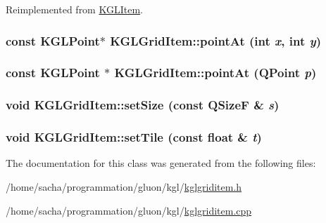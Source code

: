 Reimplemented from \hyperlink{class_k_g_l_item_2227b986b72366e149815a5fa5838d52}{KGLItem}.\hypertarget{class_k_g_l_grid_item_dcacb054e43744cdadf266eb544d827c}{
\subsubsection[{pointAt}]{\setlength{\rightskip}{0pt plus 5cm}const {\bf KGLPoint}$\ast$ KGLGridItem::pointAt (int {\em x}, \/  int {\em y})}}
\label{class_k_g_l_grid_item_dcacb054e43744cdadf266eb544d827c}


\hypertarget{class_k_g_l_grid_item_8141076182d7926b8a303639783286af}{
\subsubsection[{pointAt}]{\setlength{\rightskip}{0pt plus 5cm}const {\bf KGLPoint} $\ast$ KGLGridItem::pointAt (QPoint {\em p})}}
\label{class_k_g_l_grid_item_8141076182d7926b8a303639783286af}


\hypertarget{class_k_g_l_grid_item_5f2a3cccf7cf2ad90bf40e822907c660}{
\subsubsection[{setSize}]{\setlength{\rightskip}{0pt plus 5cm}void KGLGridItem::setSize (const QSizeF \& {\em s})}}
\label{class_k_g_l_grid_item_5f2a3cccf7cf2ad90bf40e822907c660}


\hypertarget{class_k_g_l_grid_item_7ca4ae016b8d4af31cddeea0654584df}{
\subsubsection[{setTile}]{\setlength{\rightskip}{0pt plus 5cm}void KGLGridItem::setTile (const float \& {\em t})}}
\label{class_k_g_l_grid_item_7ca4ae016b8d4af31cddeea0654584df}




The documentation for this class was generated from the following files:\begin{CompactItemize}
\item 
/home/sacha/programmation/gluon/kgl/\hyperlink{kglgriditem_8h}{kglgriditem.h}\item 
/home/sacha/programmation/gluon/kgl/\hyperlink{kglgriditem_8cpp}{kglgriditem.cpp}\end{CompactItemize}
